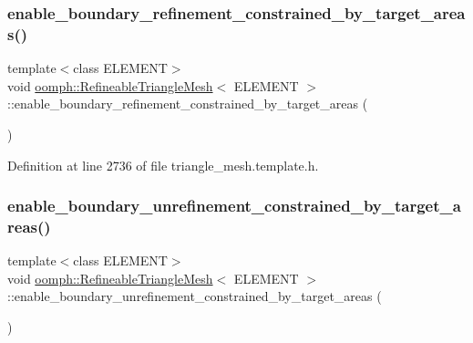 \subsubsection{\texorpdfstring{enable\+\_\+boundary\+\_\+refinement\+\_\+constrained\+\_\+by\+\_\+target\+\_\+areas()}{enable\_boundary\_refinement\_constrained\_by\_target\_areas()}}
{\footnotesize\ttfamily template$<$class E\+L\+E\+M\+E\+NT$>$ \\
void \hyperlink{classoomph_1_1RefineableTriangleMesh}{oomph\+::\+Refineable\+Triangle\+Mesh}$<$ E\+L\+E\+M\+E\+NT $>$\+::enable\+\_\+boundary\+\_\+refinement\+\_\+constrained\+\_\+by\+\_\+target\+\_\+areas (\begin{DoxyParamCaption}{ }\end{DoxyParamCaption})\hspace{0.3cm}{\ttfamily [inline]}}



Definition at line 2736 of file triangle\+\_\+mesh.\+template.\+h.

\mbox{\label{classoomph_1_1RefineableTriangleMesh_a2bac2ff237ca916e19d8ed632fef9fa4}} 
\subsubsection{\texorpdfstring{enable\+\_\+boundary\+\_\+unrefinement\+\_\+constrained\+\_\+by\+\_\+target\+\_\+areas()}{enable\_boundary\_unrefinement\_constrained\_by\_target\_areas()}}
{\footnotesize\ttfamily template$<$class E\+L\+E\+M\+E\+NT$>$ \\
void \hyperlink{classoomph_1_1RefineableTriangleMesh}{oomph\+::\+Refineable\+Triangle\+Mesh}$<$ E\+L\+E\+M\+E\+NT $>$\+::enable\+\_\+boundary\+\_\+unrefinement\+\_\+constrained\+\_\+by\+\_\+target\+\_\+areas (\begin{DoxyParamCaption}{ }\end{DoxyParamCaption})\hspace{0.3cm}{\ttfamily [inline]}}



